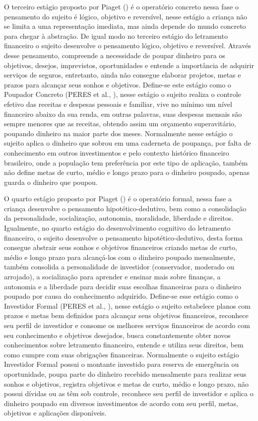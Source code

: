O terceiro estágio proposto por Piaget (\citeyear{piaget1971}) é o operatório concreto nessa fase o pensamento do sujeito é lógico, objetivo e reversível, nesse estágio a criança não se limita a uma representação imediata, mas ainda depende do mundo concreto para chegar à abstração. De igual modo no terceiro estágio do letramento financeiro o sujeito desenvolve o pensamento lógico, objetivo e reversível. Através desse pensamento, compreende a necessidade de poupar dinheiro para os objetivos, desejos, imprevistos, oportunidades e entende a importância de adquirir serviços de seguros, entretanto, ainda não consegue elaborar projetos, metas e prazos para alcançar seus sonhos e objetivos. Define-se este estágio como o Poupador Concreto (PERES et al., \citeyear{peres2019}), nesse estágio o sujeito realiza o controle efetivo das receitas e despesas pessoais e familiar, vive no mínimo um nível financeiro abaixo da sua renda, em outras palavras, suas despesas mensais são sempre menores que as receitas, obtendo assim um orçamento superavitário, poupando dinheiro na maior parte dos meses. Normalmente nesse estágio o sujeito aplica o dinheiro que sobrou em uma caderneta de poupança, por falta de conhecimento em outros investimentos e pelo contexto histórico financeiro brasileiro, onde a população tem preferência por este tipo de aplicação, também não define metas de curto, médio e longo prazo para o dinheiro poupado, apenas guarda o dinheiro que poupou.

O quarto estágio proposto por Piaget (\citeyear{piaget1971}) é o operatório formal, nessa fase a criança desenvolve o pensamento hipotético-dedutivo, bem como a consolidação da personalidade, socialização, autonomia, moralidade, liberdade e direitos. Igualmente, no quarto estágio do desenvolvimento cognitivo do letramento financeiro, o sujeito desenvolve o pensamento hipotético-dedutivo, desta forma consegue abstrair seus sonhos e objetivos financeiros criando metas de curto, médio e longo prazo para alcançá-los com o dinheiro poupado mensalmente, também consolida a personalidade de investidor (conservador, moderado ou arrojado), a socialização para aprender e ensinar mais sobre finanças, a autonomia e a liberdade para decidir suas escolhas financeiras para o dinheiro poupado por causa do conhecimento adquirido. Define-se esse estágio como o Investidor Formal (PERES et al., \citeyear{peres2019}), nesse estágio o sujeito estabelece planos com prazos e metas bem definidos para alcançar seus objetivos financeiros, reconhece seu perfil de investidor e consome os melhores serviços financeiros de acordo com seu conhecimento e objetivos desejados, busca constantemente obter novos conhecimentos sobre letramento financeiro, entende e utiliza seus direitos, bem como cumpre com suas obrigações financeiras. Normalmente o sujeito estágio Investidor Formal possui o montante investido para reserva de emergência ou oportunidade, poupa parte do dinheiro recebido mensalmente para realizar seus sonhos e objetivos, registra objetivos e metas de curto, médio e longo prazo, não possui dívidas ou as têm sob controle, reconhece seu perfil de investidor e aplica o dinheiro poupado em diversos investimentos de acordo com seu perfil, metas, objetivos e aplicações disponíveis.

